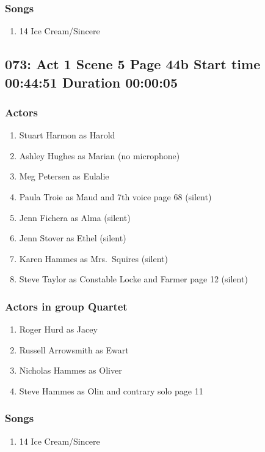 \subsubsection{Songs}
\begin{enumerate}
\item 14 Ice Cream/Sincere
\end{enumerate}
\subsection{073: Act 1 Scene 5 Page 44b Start time 00:44:51 Duration 00:00:05}

\subsubsection{Actors}
\begin{enumerate}
\item Stuart Harmon as Harold
\item Ashley Hughes as Marian (no microphone)
\item Meg Petersen as Eulalie
\item Paula Troie as Maud and 7th voice page 68 (silent)
\item Jenn Fichera as Alma (silent)
\item Jenn Stover as Ethel (silent)
\item Karen Hammes as Mrs.~Squires (silent)
\item Steve Taylor as Constable Locke and Farmer page 12 (silent)
\end{enumerate}
\subsubsection{Actors in group Quartet}
\begin{enumerate}
\item Roger Hurd as Jacey
\item Russell Arrowsmith as Ewart
\item Nicholas Hammes as Oliver
\item Steve Hammes as Olin and contrary solo page 11
\end{enumerate}

\subsubsection{Songs}
\begin{enumerate}
\item 14 Ice Cream/Sincere
\end{enumerate}
